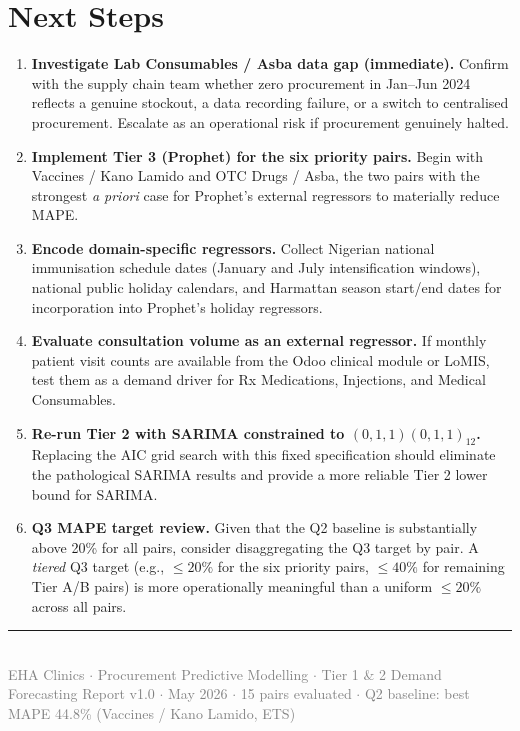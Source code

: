 \documentclass[12pt, a4paper]{article}
\begin{document}
\section{Next Steps}

\begin{enumerate}[leftmargin=1.5em, itemsep=6pt]
  \item \textbf{Investigate Lab Consumables / Asba data gap (immediate).}
        Confirm with the supply chain team whether zero procurement in
        Jan--Jun 2024 reflects a genuine stockout, a data recording failure,
        or a switch to centralised procurement. Escalate as an operational
        risk if procurement genuinely halted.

  \item \textbf{Implement Tier 3 (Prophet) for the six priority pairs.}
        Begin with Vaccines / Kano Lamido and OTC Drugs / Asba, the two
        pairs with the strongest \textit{a priori} case for Prophet's
        external regressors to materially reduce MAPE.

  \item \textbf{Encode domain-specific regressors.}
        Collect Nigerian national immunisation schedule dates
        (January and July intensification windows), national public
        holiday calendars, and Harmattan season start/end dates for
        incorporation into Prophet's holiday regressors.

  \item \textbf{Evaluate consultation volume as an external regressor.}
        If monthly patient visit counts are available from the Odoo
        clinical module or LoMIS, test them as a demand driver for
        Rx Medications, Injections, and Medical Consumables.

  \item \textbf{Re-run Tier 2 with SARIMA constrained to
        $(0,1,1)(0,1,1)_{12}$.}
        Replacing the AIC grid search with this fixed specification
        should eliminate the pathological SARIMA results and provide
        a more reliable Tier 2 lower bound for SARIMA.

  \item \textbf{Q3 MAPE target review.}
        Given that the Q2 baseline is substantially above 20\% for all
        pairs, consider disaggregating the Q3 target by pair. A
        \textit{tiered} Q3 target (e.g., $\leq 20\%$ for the six
        priority pairs, $\leq 40\%$ for remaining Tier A/B pairs) is
        more operationally meaningful than a uniform $\leq 20\%$
        across all pairs.
\end{enumerate}

\vfill

\noindent\textcolor{ehaBlue!40!white}{\rule{\textwidth}{0.4pt}}\\[0.4em]
{\small\textcolor{gray}{EHA Clinics $\cdot$ Procurement Predictive Modelling $\cdot$
Tier 1 \& 2 Demand Forecasting Report v1.0 $\cdot$ May 2026 $\cdot$
15 pairs evaluated $\cdot$ Q2 baseline: best MAPE 44.8\% (Vaccines / Kano Lamido, ETS)}}
\end{document}
